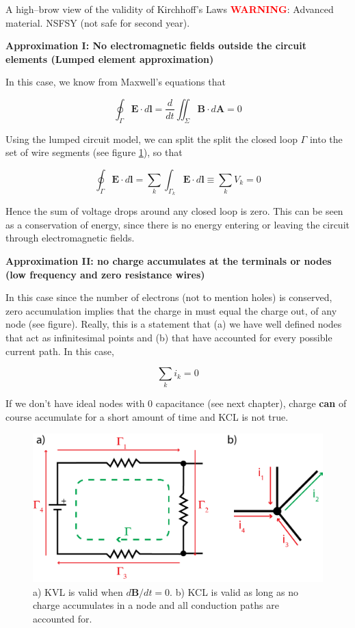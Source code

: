 \documentclass{tufte-book}
\begin{document}
\begin{myexample}[label = ex:when_kirchhoff_isvalid]{A high--brow view of the validity of Kirchhoff's Laws}
\textcolor{red}{\textbf{WARNING}}: Advanced material. NSFSY (not safe for second year).

\noindent\textbf{Approximation I: No electromagnetic fields outside the circuit elements (Lumped element approximation)}

In this case, we know from Maxwell's equations that

$$
\oint_\Gamma\textbf{E}\cdot d\textbf{l} = \frac{d}{dt}\iint_\Sigma\textbf{B}\cdot d\textbf{A} = 0
$$

Using the lumped circuit model, we can split the split the closed loop $\Gamma$ into the set of wire segments (see figure \ref{fig:when_kirchhoff_isvalid}), so that

$$
\oint_\Gamma\textbf{E}\cdot d\textbf{l} = \sum_k\int_{\Gamma_k}\textbf{E}\cdot d\textbf{l} \equiv \sum_kV_k = 0
$$

Hence the sum of voltage drops around any closed loop is zero. This can be seen as a conservation of energy, since there is no energy entering or leaving the circuit through electromagnetic fields.

\noindent\textbf{Approximation II: no charge accumulates at the terminals or nodes (low frequency and zero resistance wires)}

In this case since the number of electrons (not to mention holes) is conserved, zero accumulation implies that the charge in must equal the charge out, of any node (see figure). Really, this is a statement that (a) we have well defined nodes that act as infinitesimal points and (b) that have accounted for every possible current path. In this case,

$$
\sum_ki_k=0
$$

\noindent If we don't have ideal nodes with 0 capacitance (see next chapter), charge \textbf{can} of course accumulate for a short amount of time and KCL is not true.

\end{myexample}

\begin{figure}%
  \includegraphics[width=\linewidth]{kirchoff_highbrow}
  \caption{a) KVL is valid when $d\textbf{B}/dt = 0$. b) KCL is valid as long as no charge accumulates in a node and all conduction paths are accounted for.}
  \label{fig:when_kirchhoff_isvalid}
\end{figure}
\end{document}
